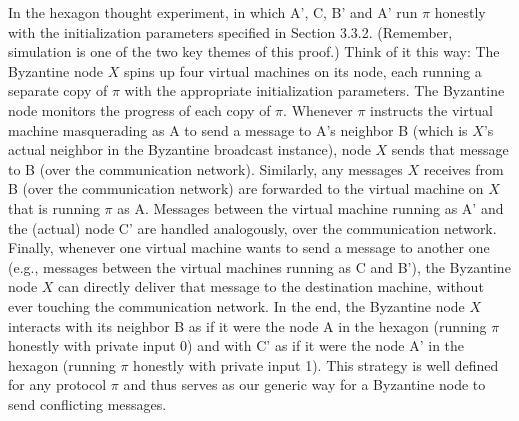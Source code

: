 In the hexagon thought experiment, in which A', C, B' and A' run $\pi$ honestly with the
initialization parameters specified in Section 3.3.2. (Remember, simulation is one of the two
key themes of this proof.) Think of it this way: The Byzantine node $X$ spins up four virtual
machines on its node, each running a separate copy of $\pi$ with the appropriate initialization
parameters. The Byzantine node monitors the progress of each copy of $\pi$. Whenever $\pi$ instructs the virtual machine masquerading as A to send a message to A’s neighbor B
(which is $X$’s actual neighbor in the Byzantine broadcast instance), node $X$ sends that
message to B (over the communication network). Similarly, any messages $X$ receives from
B (over the communication network) are forwarded to the virtual machine on $X$ that is
running $\pi$ as A. Messages between the virtual machine running as A' and the (actual)
node C' are handled analogously, over the communication network. Finally, whenever one
virtual machine wants to send a message to another one (e.g., messages between the virtual
machines running as C and B'), the Byzantine node $X$ can directly deliver that message
to the destination machine, without ever touching the communication network. In the end,
the Byzantine node $X$ interacts with its neighbor B as if it were the node A in the hexagon
(running $\pi$ honestly with private input 0) and with C' as if it were the node A'
in the hexagon (running $\pi$ honestly with private input 1). This strategy is well defined for any protocol $\pi$
and thus serves as our generic way for a Byzantine node to send conflicting messages.\\
